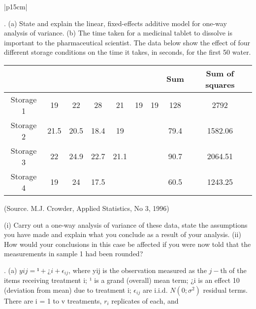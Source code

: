 \documentclass[a4paper,12pt]{article}
\begin{document}
\begin{table}[ht!]
     
\centering
     
\begin{tabular}{|p{15cm}|}
     
. (a) State and explain the linear, fixed-effects additive model for one-way analysis of
variance.
(b) The time taken for a medicinal tablet to dissolve is important to the pharmaceutical
scientist. The data below show the effect of four different storage conditions on the
time it takes, in seconds, for the first 50%
water.


\begin{center}
\begin{tabular}{|c|c|c|c|c|c|c|c|c|}
	&		&		&		&		&		&		&	Sum	&	 Sum of
squares	\\  \hline
Storage 1 	&	19	&	22	&	28	&	21	&	19	&	19	&	128	&	2792	\\  \hline
Storage 2 	&	21.5	&	20.5	&	18.4	&	19	&		&		&	79.4	&	1582.06	\\  \hline
Storage 3 	&	22	&	24.9	&	22.7	&	21.1	&		&		&	90.7	&	2064.51	\\  \hline
Storage 4	&	19	&	24	&	17.5	&		&		&		&	60.5	&	1243.25	\\  \hline
\end{tabular}
\end{center}
(Source. M.J. Crowder, Applied Statistics, No 3, 1996)

(i) Carry out a one-way analysis of variance of these data, state the assumptions you
have made and explain what you conclude as a result of your analysis.
(ii) How would your conclusions in this case be affected if you were now told that the
measurements in sample 1 had been rounded?
\\ \hline
      
\end{tabular}
    
\end{table}
. (a) $yij = ¹ + ¿i + \epsilon_{ij}$, where yij is the observation measured as the $j-$th of the
items receiving treatment i; ¹ is a grand (overall) mean term; ¿i is an effect
10
(deviation from mean) due to treatment i; $\epsilon_{ij}$ are i.i.d. $N(0; \sigma^2)$ residual
terms. There are i = 1 to v treatments, $r_i$ replicates of each, and
\end{document}
